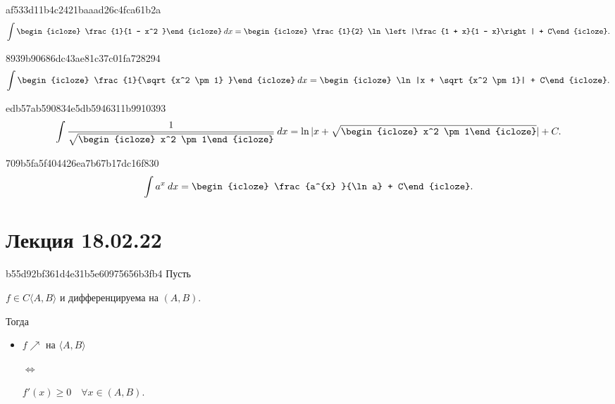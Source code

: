 \begin{note}{af533d11b4c2421baaad26c4fca61b2a}
    \[
        \int \begin{icloze}{2}\frac{1}{1 - x^2 }\end{icloze} \: dx = \begin{icloze}{1}\frac{1}{2} \ln\left|\frac{1 + x}{1 - x}\right| + C\end{icloze}.
    \]
\end{note}

\begin{note}{8939b90686dc43ae81c37c01fa728294}
    \[
        \int \begin{icloze}{2}\frac{1}{\sqrt{x^2 \pm 1} }\end{icloze} \: dx = \begin{icloze}{1}\ln |x + \sqrt{x^2 \pm 1}| + C\end{icloze}.
    \]
\end{note}

\begin{note}{edb57ab590834e5db5946311b9910393}
    \[
        \int \frac{1}{\sqrt{\begin{icloze}{1}x^2 \pm 1\end{icloze}} } \: dx = \ln |x + \sqrt{\begin{icloze}{1}x^2 \pm 1\end{icloze}}| + C.
    \]
\end{note}

\begin{note}{709b5fa5f404426ea7b67b17dc16f830}
    \[
        \int a^{x} \: dx = \begin{icloze}{1}\frac{a^{x} }{\ln a} + C\end{icloze}.
    \]
\end{note}

\section{Лекция 18.02.22}
\begin{note}{b55d92bf361d4e31b5e60975656b3fb4}
    Пусть \begin{icloze}{4}\( f \in C\langle A, B \rangle  \) и дифференцируема на \( (A, B) \).\end{icloze} Тогда
    \begin{itemize}
        \item {}\begin{icloze}{2}\( f \!\nearrow \) на \( \langle A, B \rangle  \)\end{icloze}
            \begin{icloze}{3}\( \iff  \)\end{icloze}
            \begin{icloze}{1}\( f'(x) \geqslant 0 \quad \forall x \in (A, B) \).\end{icloze}
    \end{itemize}
\end{note}


